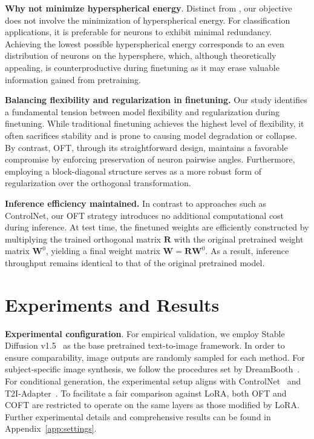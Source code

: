 \textbf{Why not minimize hyperspherical energy}. Distinct from \cite{liu2021orthogonal}, our objective does not involve the minimization of hyperspherical energy. For classification applications, it is preferable for neurons to exhibit minimal redundancy. Achieving the lowest possible hyperspherical energy corresponds to an even distribution of neurons on the hypersphere, which, although theoretically appealing, is counterproductive during finetuning as it may erase valuable information gained from pretraining.

\textbf{Balancing flexibility and regularization in finetuning.} Our study identifies a fundamental tension between model flexibility and regularization during finetuning. While traditional finetuning achieves the highest level of flexibility, it often sacrifices stability and is prone to causing model degradation or collapse. By contrast, OFT, through its straightforward design, maintains a favorable compromise by enforcing preservation of neuron pairwise angles. Furthermore, employing a block-diagonal structure serves as a more robust form of regularization over the orthogonal transformation.

\textbf{Inference efficiency maintained.} In contrast to approaches such as ControlNet, our OFT strategy introduces no additional computational cost during inference. At test time, the finetuned weights are efficiently constructed by multiplying the trained orthogonal matrix $\bm{R}$ with the original pretrained weight matrix $\bm{W}^0$, yielding a final weight matrix $\bm{W}=\bm{R}\bm{W}^0$. As a result, inference throughput remains identical to that of the original pretrained model.

\section{Experiments and Results}

\textbf{Experimental configuration}. For empirical validation, we employ Stable Diffusion v1.5~\cite{rombach2022high} as the base pretrained text-to-image framework. In order to ensure comparability, image outputs are randomly sampled for each method. For subject-specific image synthesis, we follow the procedures set by DreamBooth~\cite{ruiz2023dreambooth}. For conditional generation, the experimental setup aligns with ControlNet~\cite{zhang2023adding} and T2I-Adapter~\cite{mou2023t2i}. To facilitate a fair comparison against LoRA, both OFT and COFT are restricted to operate on the same layers as those modified by LoRA. Further experimental details and comprehensive results can be found in Appendix~\ref{app:settings}.

